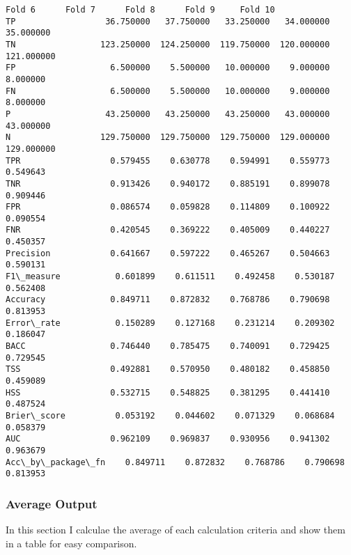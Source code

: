 \documentclass[11pt]{article}
\begin{document}
\begin{tcolorbox}[breakable, size=fbox, boxrule=.5pt, pad at break*=1mm, opacityfill=0]
\begin{Verbatim}[commandchars=\\\{\}]
                       Fold 6      Fold 7      Fold 8      Fold 9     Fold 10
TP                  36.750000   37.750000   33.250000   34.000000   35.000000
TN                 123.250000  124.250000  119.750000  120.000000  121.000000
FP                   6.500000    5.500000   10.000000    9.000000    8.000000
FN                   6.500000    5.500000   10.000000    9.000000    8.000000
P                   43.250000   43.250000   43.250000   43.000000   43.000000
N                  129.750000  129.750000  129.750000  129.000000  129.000000
TPR                  0.579455    0.630778    0.594991    0.559773    0.549643
TNR                  0.913426    0.940172    0.885191    0.899078    0.909446
FPR                  0.086574    0.059828    0.114809    0.100922    0.090554
FNR                  0.420545    0.369222    0.405009    0.440227    0.450357
Precision            0.641667    0.597222    0.465267    0.504663    0.590131
F1\_measure           0.601899    0.611511    0.492458    0.530187    0.562408
Accuracy             0.849711    0.872832    0.768786    0.790698    0.813953
Error\_rate           0.150289    0.127168    0.231214    0.209302    0.186047
BACC                 0.746440    0.785475    0.740091    0.729425    0.729545
TSS                  0.492881    0.570950    0.480182    0.458850    0.459089
HSS                  0.532715    0.548825    0.381295    0.441410    0.487524
Brier\_score          0.053192    0.044602    0.071329    0.068684    0.058379
AUC                  0.962109    0.969837    0.930956    0.941302    0.963679
Acc\_by\_package\_fn    0.849711    0.872832    0.768786    0.790698    0.813953
\end{Verbatim}
\end{tcolorbox}
        
    \subsubsection{Average Output}\label{average-output}

In this section I calculae the average of each calculation criteria and
show them in a table for easy comparison.
\end{document}
